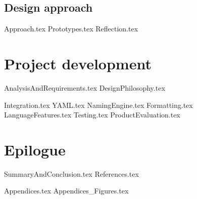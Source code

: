 \documentclass{article} %
\begin{document}
\subsection{Design approach}
{Approach.tex}
{Prototypes.tex}
{Reflection.tex}

\newpage
\section{Project development}
{AnalysisAndRequirements.tex}
{DesignPhilosophy.tex}

{Integration.tex}
{YAML.tex}
{NamingEngine.tex}
{Formatting.tex}
{LanguageFeatures.tex}
{Testing.tex}
{ProductEvaluation.tex}

\newpage
\section{Epilogue}
{SummaryAndConclusion.tex}
{References.tex}
\addtocounter{section}{1}
\setcounter{subsection}{0}
{Appendices.tex}
{Appendices_Figures.tex}
\end{document}
